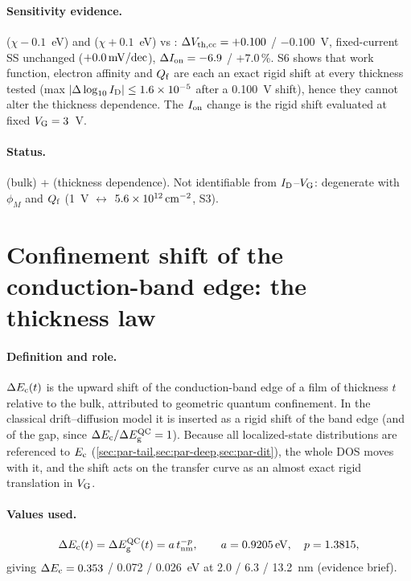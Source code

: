 \paragraph{Sensitivity evidence.}
 ($\chi-0.1$~eV) and  ($\chi+0.1$~eV) vs : $\Delta V_{\mathrm{th,cc}} = +0.100$ / $-0.100$~V,
fixed-current SS unchanged ($+0.0\,\mathrm{mV/dec}$), $\Delta I_{\mathrm{on}} = -6.9$ / $+7.0$\,\%. S6 shows that work function,
electron affinity and $Q_{\mathrm{f}}$ are each an exact rigid shift at every thickness tested (max
$|\Delta\log_{10}I_{\mathrm{D}}| \le 1.6\times10^{-5}$ after a 0.100~V shift), hence they cannot alter the thickness
dependence. The $I_{\mathrm{on}}$ change is the rigid shift evaluated at fixed $V_{\mathrm{G}} = 3$~V.

\paragraph{Status.}
 (bulk) +  (thickness dependence). Not identifiable from
$I_{\mathrm{D}}$--$V_{\mathrm{G}}$: degenerate with $\phi_M$ and $Q_{\mathrm{f}}$ (1~V $\leftrightarrow$ $5.6\times10^{12}\,\mathrm{cm}^{-2}$, S3).

\section{Confinement shift of the conduction-band edge: the thickness law}
\label{sec:par-dec}

\paragraph{Definition and role.}
$\Delta E_{\mathrm{c}}(t)$ is the upward shift of the conduction-band edge of a film of thickness $t$ relative to the bulk,
attributed to geometric quantum confinement. In the classical drift--diffusion model it is inserted as a
rigid shift of the band edge (and of the gap, since $\Delta E_{\mathrm{c}}/\Delta E_{\mathrm{g}}^{\mathrm{QC}} = 1$). Because all localized-state distributions
are referenced to $E_{\mathrm{c}}$ (\cref{sec:par-tail,sec:par-deep,sec:par-dit}), the whole DOS moves with it, and the
shift acts on the transfer curve as an almost exact rigid translation in $V_{\mathrm{G}}$.

\paragraph{Values used.}
\begin{equation}
  \Delta E_{\mathrm{c}}(t) = \Delta E_{\mathrm{g}}^{\mathrm{QC}}(t) = a\,t_{\mathrm{nm}}^{-p},\qquad a = \SI{0.9205}{eV},\quad p = 1.3815,
  \label{eq:dec-law}
\end{equation}
giving $\Delta E_{\mathrm{c}} = 0.353$ / 0.072 / 0.026~eV at 2.0 / 6.3 / 13.2~nm (evidence brief).

